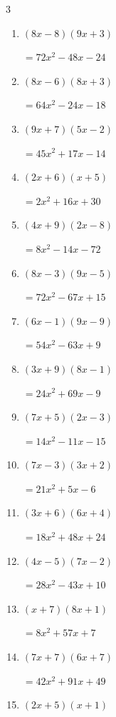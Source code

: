 \begin{multicols}{3}
\begin{enumerate}
        $=72x^{2}+99x+27$

\columnbreak %

\resetques

  \item $(8x-8)(9x+3)$

        $=72x^{2}-48x-24$

  \item $(8x-6)(8x+3)$

        $=64x^{2}-24x-18$

  \item $(9x+7)(5x-2)$

        $=45x^{2}+17x-14$

  \item $(2x+6)(x+5)$

        $=2x^{2}+16x+30$

  \item $(4x+9)(2x-8)$

        $=8x^{2}-14x-72$

  \item $(8x-3)(9x-5)$

        $=72x^{2}-67x+15$

  \item $(6x-1)(9x-9)$

        $=54x^{2}-63x+9$

  \item $(3x+9)(8x-1)$

        $=24x^{2}+69x-9$

  \item $(7x+5)(2x-3)$

        $=14x^{2}-11x-15$

  \item $(7x-3)(3x+2)$

        $=21x^{2}+5x-6$

  \item $(3x+6)(6x+4)$

        $=18x^{2}+48x+24$

  \item $(4x-5)(7x-2)$

        $=28x^{2}-43x+10$

  \item $(x+7)(8x+1)$

        $=8x^{2}+57x+7$

  \item $(7x+7)(6x+7)$

        $=42x^{2}+91x+49$

  \item $(2x+5)(x+1)$


\end{enumerate}
\end{multicols}
